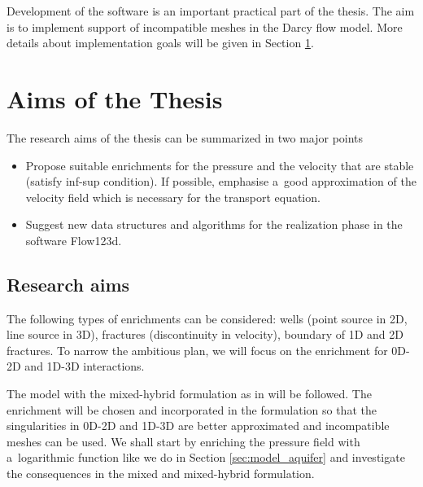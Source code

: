 Development of the software is an important practical part of the thesis. The aim is to implement support 
of incompatible meshes in the Darcy flow model. More details about implementation goals will be given in
Section \ref{chap:aims}.



\section{Aims of the Thesis}\label{chap:aims}

The research aims of the thesis can be summarized in two major points
\begin{itemize}
  \item Propose suitable enrichments for the pressure and the velocity that are stable (satisfy inf-sup condition). 
        If possible, emphasise a~good approximation of the velocity field which is necessary for the transport equation.
        
  \item Suggest new data structures and algorithms for the realization phase in the software Flow123d. 
\end{itemize}

\subsection{Research aims}

The following types of enrichments can be considered: wells (point source in 2D, line source in 3D), 
fractures (discontinuity in velocity), boundary of 1D and 2D fractures. 
To narrow the ambitious plan, we will focus on the enrichment for 0D-2D and 1D-3D interactions.

The model with the mixed-hybrid formulation as in \cite{brezina_mixed-hybrid_2010, sistek_bddc_2015} will be followed.
The enrichment will be chosen and incorporated in the formulation so that the singularities in 0D-2D and
1D-3D are better approximated and incompatible meshes can be used. 
We shall start by enriching the pressure field with a~logarithmic function like we
do in Section \ref{sec:model_aquifer} and investigate the consequences in the mixed and mixed-hybrid formulation.

